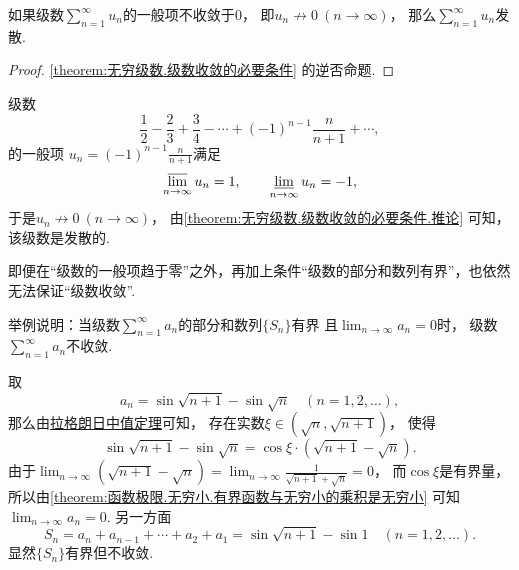 \begin{corollary}\label{theorem:无穷级数.级数收敛的必要条件.推论}
如果级数\(\sum_{n=1}^\infty u_n\)的一般项不收敛于\(0\)，
即\(u_n \not\to 0\ (n\to\infty)\)，
那么\(\sum_{n=1}^\infty u_n\)发散.
\begin{proof}
\cref{theorem:无穷级数.级数收敛的必要条件} 的逆否命题.
\end{proof}
\end{corollary}

\begin{example}
级数\begin{equation*}
	\frac12-\frac23+\frac34-\dotsb+(-1)^{n-1}\frac{n}{n+1}+\dotsb,
\end{equation*}的一般项
\(u_n = (-1)^{n-1} \frac{n}{n+1}\)满足\begin{equation*}
	\varlimsup_{n\to\infty} u_n = 1,
	\qquad
	\varliminf_{n\to\infty} u_n = -1,
\end{equation*}
于是\(u_n \not\to 0\ (n\to\infty)\)，
由\cref{theorem:无穷级数.级数收敛的必要条件.推论} 可知，该级数是发散的.
\end{example}

即便在“级数的一般项趋于零”之外，再加上条件“级数的部分和数列有界”，也依然无法保证“级数收敛”.
\begin{example}
举例说明：当级数\(\sum_{n=1}^\infty a_n\)的部分和数列\(\{S_n\}\)有界
且\(\lim_{n\to\infty} a_n = 0\)时，
级数\(\sum_{n=1}^\infty a_n\)不收敛.
\begin{solution}
取\begin{equation*}
	a_n = \sin\sqrt{n+1} - \sin\sqrt{n}
	\quad(n=1,2,\dotsc),
\end{equation*}
那么由\hyperref[theorem:微分中值定理.拉格朗日中值定理]{拉格朗日中值定理}可知，
存在实数\(\xi\in(\sqrt{n},\sqrt{n+1})\)，
使得\begin{equation*}
	\sin\sqrt{n+1} - \sin\sqrt{n}
	= \cos\xi \cdot (\sqrt{n+1} - \sqrt{n}).
\end{equation*}
由于\(\lim_{n\to\infty} (\sqrt{n+1} - \sqrt{n})
= \lim_{n\to\infty} \frac1{\sqrt{n+1} + \sqrt{n}}
= 0\)，
而\(\cos\xi\)是有界量，
所以由\cref{theorem:函数极限.无穷小.有界函数与无穷小的乘积是无穷小}
可知\(\lim_{n\to\infty} a_n = 0\).
另一方面\begin{equation*}
	S_n = a_n + a_{n-1} + \dotsb + a_2 + a_1
	= \sin\sqrt{n+1} - \sin1
	\quad(n=1,2,\dotsc).
\end{equation*}
显然\(\{S_n\}\)有界但不收敛.
\end{solution}
\end{example}

